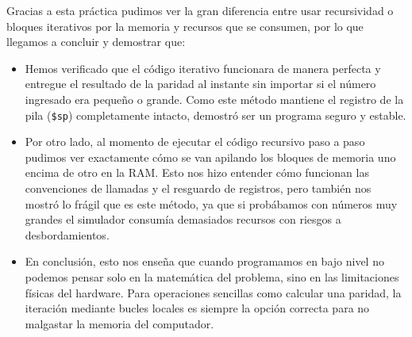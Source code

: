 \documentclass[12pt,letterpaper]{article}
\begin{document}
\begin{enumerate}
    \vspace{0.3cm}
    Gracias a esta práctica pudimos ver la gran diferencia entre usar recursividad o bloques iterativos por la memoria y recursos que se consumen, por lo que llegamos a concluir y demostrar que:
    \begin{itemize}
        \item Hemos verificado que el código iterativo funcionara de manera perfecta y entregue el resultado de la paridad al instante sin importar si el número ingresado era pequeño o grande. Como este método mantiene el registro de la pila (\texttt{\$sp}) completamente intacto, demostró ser un programa seguro y estable.
        \item Por otro lado, al momento de ejecutar el código recursivo paso a paso pudimos ver exactamente cómo se van apilando los bloques de memoria uno encima de otro en la RAM. Esto nos hizo entender cómo funcionan las convenciones de llamadas y el resguardo de registros, pero también nos mostró lo frágil que es este método, ya que si probábamos con números muy grandes el simulador consumía demasiados recursos con riesgos a desbordamientos.
        \item En conclusión, esto nos enseña que cuando programamos en bajo nivel no podemos pensar solo en la matemática del problema, sino en las limitaciones físicas del hardware. Para operaciones sencillas como calcular una paridad, la iteración mediante bucles locales es siempre la opción correcta para no malgastar la memoria del computador.
    \end{itemize}

\end{enumerate}
\end{document}
